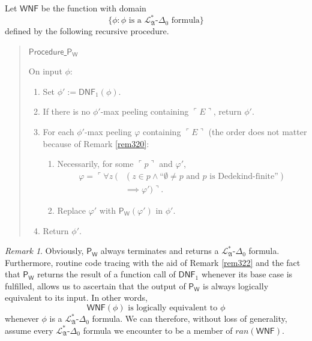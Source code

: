 \documentclass[12pt, twoside]{memoir}
\numberwithin{equation}{section}
\theoremstyle{definition}
\theoremstyle{remark}
\newtheorem{rem}[thm]{Remark}
\theoremstyle{definition}
\theoremstyle{definition}
\theoremstyle{definition}
\theoremstyle{remark}
\begin{document}
Let $\mathsf{WNF}$ be the function with domain
\begin{equation*}
    \{\phi: \phi \text{ is a } \mathcal{L}^{*}_{\mathfrak{A}}\text{-}\Delta_0 \text{ formula}\} 
\end{equation*} 
defined by the following recursive procedure.

\begin{quote}
    \underline{$\mathsf{Procedure}$ $\mathsf{P_W}$}

    On input $\phi$:
    \begin{enumerate}[label=(\arabic*)]
        \item Set $\phi' := \mathsf{DNF}_1(\phi)$.
        \item If there is no $\phi'$-max peeling containing $\ulcorner E \urcorner$, return $\phi'$.
        \item For each $\phi'$-max peeling $\varphi$ containing $\ulcorner E \urcorner$ (the order does not matter because of Remark \ref{rem320}:
        \begin{enumerate}[label=(F\arabic*), leftmargin=30pt]
            \item Necessarily, for some $\ulcorner p \urcorner$ and $\varphi'$,
                \begin{align*}
                    \varphi = \ulcorner \forall z \ ( & (z \in p \wedge \text{``}\emptyset \neq p \text{ and } p \text{ is Dedekind-finite''}) \\
                    & \implies \varphi') \urcorner \text{.}
                \end{align*}
            \item Replace $\varphi'$ with $\mathsf{P_W}(\varphi')$ in $\phi'$.
        \end{enumerate}
        \item Return $\phi'$.
    \end{enumerate}
\end{quote}

\begin{rem}\label{rem321}
Obviously, $\mathsf{P_W}$ always terminates and returns a $\mathcal{L}^{*}_{\mathfrak{A}}$-$\Delta_0$ formula. Furthermore, routine code tracing with the aid of Remark \ref{rem322} and the fact that $\mathsf{P_W}$ returns the result of a function call of $\mathsf{DNF}_1$ whenever its base case is fulfilled, allows us to ascertain that the output of $\mathsf{P_W}$ is always logically equivalent to its input. In other words, 
\begin{equation*}
    \mathsf{WNF}(\phi) \text{ is logically equivalent to } \phi
\end{equation*}
whenever $\phi$ is a $\mathcal{L}^{*}_{\mathfrak{A}}$-$\Delta_0$ formula. We can therefore, without loss of generality, assume every $\mathcal{L}^{*}_{\mathfrak{A}}$-$\Delta_0$ formula we encounter to be a member of $ran(\mathsf{WNF})$.
\end{rem}
\end{document}
